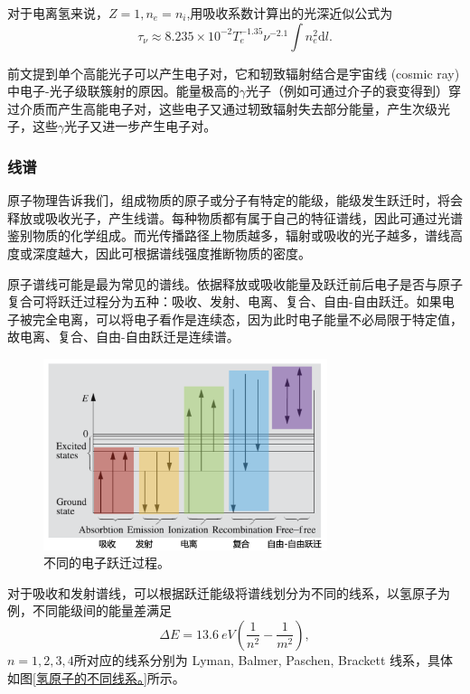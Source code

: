 \documentclass[../天体物理基础.tex]{subfiles}
\begin{document}
对于电离氢来说，$Z=1,n_{e}=n_{i}$,用吸收系数计算出的光深近似公式为
\begin{equation}
\tau_{\nu}\approx8.235\times10^{-2}T_{e}^{-1.35}\nu^{-2.1}\int n_{e}^{2}\mathrm{d}l.
\end{equation}

前文提到单个高能光子可以产生电子对，它和轫致辐射结合是宇宙线 (cosmic ray) 中电⼦{}-{}光⼦级联簇射的原因。能量极⾼的$\gamma$光⼦（例如可通过介⼦的衰变得到）穿过介质⽽产生⾼能电⼦对，这些电子又通过轫致辐射失去部分能量，产⽣次级光⼦，这些$\gamma$光⼦又进一步产⽣电⼦对。

\subsubsection{线谱}
原子物理告诉我们，组成物质的原子或分子有特定的能级，能级发生跃迁时，将会释放或吸收光子，产生线谱。每种物质都有属于自己的特征谱线，因此可通过光谱鉴别物质的化学组成。而光传播路径上物质越多，辐射或吸收的光子越多，谱线高度或深度越大，因此可根据谱线强度推断物质的密度。

原子谱线可能是最为常见的谱线。依据释放或吸收能量及跃迁前后电子是否与原子复合可将跃迁过程分为五种：吸收、发射、电离、复合、自由{}-{}自由跃迁。如果电子被完全电离，可以将电子看作是连续态，因为此时电子能量不必局限于特定值，故电离、复合、自由{}-{}自由跃迁是连续谱。
\begin{figure}[!htbp]
\centering
\includegraphics[width=8.3cm]{figures/figure1_10.png}
\captionsetup{justification=raggedright, singlelinecheck=false}
\caption{不同的电子跃迁过程。}
\label{不同的电子跃迁过程。}
\end{figure}

对于吸收和发射谱线，可以根据跃迁能级将谱线划分为不同的线系，以氢原子为例，不同能级间的能量差满足
\begin{equation}
\Delta{}E=\qty{13,6}{eV}\left(\frac{1}{n^{2}}-\frac{1}{m^{2}}\right),
\end{equation}
$n=1,2,3,4$所对应的线系分别为 Lyman, Balmer, Paschen, Brackett 线系，具体如图\ref{氢原子的不同线系。}所示。
\end{document}
